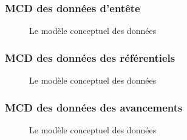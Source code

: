 \documentclass[a4paper]{report}
\begin{document}
\begin{doublespace}
	\subsubsection{MCD des données d'entête}
	\begin{figure}[H]
		\begin{center}
			\caption{Le modèle conceptuel des données}
		\end{center}
	\end{figure}
	\subsubsection{MCD des données des référentiels}
	\begin{figure}[H]
		\begin{center}
			\caption{Le modèle conceptuel des données}
		\end{center}
	\end{figure}
	\subsubsection{MCD des données des avancements}
	\begin{figure}[H]
		\begin{center}
			\caption{Le modèle conceptuel des données}
		\end{center}
	\end{figure}

\end{doublespace}
\end{document}
